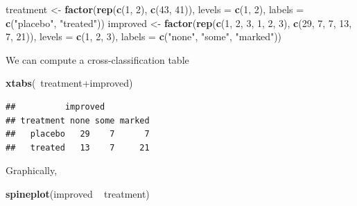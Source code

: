 \documentclass[]{article}
\newenvironment{Shaded}{\begin{snugshade}}{\end{snugshade}}
\newcommand{\KeywordTok}[1]{\textcolor[rgb]{0.13,0.29,0.53}{\textbf{{#1}}}}
\newcommand{\DataTypeTok}[1]{\textcolor[rgb]{0.13,0.29,0.53}{{#1}}}
\newcommand{\DecValTok}[1]{\textcolor[rgb]{0.00,0.00,0.81}{{#1}}}
\newcommand{\StringTok}[1]{\textcolor[rgb]{0.31,0.60,0.02}{{#1}}}
\newcommand{\NormalTok}[1]{{#1}}
\numberwithin{equation}{section}
\begin{document}
\begin{Shaded}
\begin{Highlighting}[]
\NormalTok{treatment <-}\StringTok{ }\KeywordTok{factor}\NormalTok{(}\KeywordTok{rep}\NormalTok{(}\KeywordTok{c}\NormalTok{(}\DecValTok{1}\NormalTok{, }\DecValTok{2}\NormalTok{), }\KeywordTok{c}\NormalTok{(}\DecValTok{43}\NormalTok{, }\DecValTok{41}\NormalTok{)), }\DataTypeTok{levels =} \KeywordTok{c}\NormalTok{(}\DecValTok{1}\NormalTok{, }\DecValTok{2}\NormalTok{),}
                    \DataTypeTok{labels =} \KeywordTok{c}\NormalTok{(}\StringTok{"placebo"}\NormalTok{, }\StringTok{"treated"}\NormalTok{))}
\NormalTok{improved <-}\StringTok{ }\KeywordTok{factor}\NormalTok{(}\KeywordTok{rep}\NormalTok{(}\KeywordTok{c}\NormalTok{(}\DecValTok{1}\NormalTok{, }\DecValTok{2}\NormalTok{, }\DecValTok{3}\NormalTok{, }\DecValTok{1}\NormalTok{, }\DecValTok{2}\NormalTok{, }\DecValTok{3}\NormalTok{), }\KeywordTok{c}\NormalTok{(}\DecValTok{29}\NormalTok{, }\DecValTok{7}\NormalTok{, }\DecValTok{7}\NormalTok{, }\DecValTok{13}\NormalTok{, }\DecValTok{7}\NormalTok{, }\DecValTok{21}\NormalTok{)),}
                   \DataTypeTok{levels =} \KeywordTok{c}\NormalTok{(}\DecValTok{1}\NormalTok{, }\DecValTok{2}\NormalTok{, }\DecValTok{3}\NormalTok{),}
                   \DataTypeTok{labels =} \KeywordTok{c}\NormalTok{(}\StringTok{"none"}\NormalTok{, }\StringTok{"some"}\NormalTok{, }\StringTok{"marked"}\NormalTok{))}
\end{Highlighting}
\end{Shaded}

We can compute a cross-classification table

\begin{Shaded}
\begin{Highlighting}[]
\KeywordTok{xtabs}\NormalTok{(~treatment+improved)}
\end{Highlighting}
\end{Shaded}

\begin{verbatim}
##          improved
## treatment none some marked
##   placebo   29    7      7
##   treated   13    7     21
\end{verbatim}

Graphically,

\begin{Shaded}
\begin{Highlighting}[]
\KeywordTok{spineplot}\NormalTok{(improved ~}\StringTok{ }\NormalTok{treatment)}
\end{Highlighting}
\end{Shaded}
\end{document}

